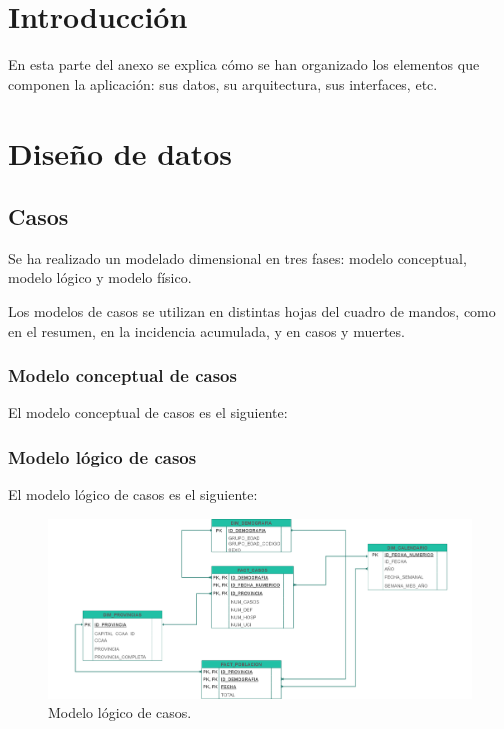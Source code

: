 
\section{Introducción}
En esta parte del anexo se explica cómo se han organizado los elementos que componen la aplicación: sus datos, su arquitectura, sus interfaces, etc.
\section{Diseño de datos}
\subsection{Casos}
Se ha realizado un modelado dimensional en tres fases: modelo conceptual, modelo lógico y modelo físico.

Los modelos de casos se utilizan en distintas hojas del cuadro de mandos, como en el resumen, en la incidencia acumulada, y en casos y muertes.

\subsubsection{Modelo conceptual de casos}
El modelo conceptual de casos es el siguiente:


\subsubsection{Modelo lógico de casos}

El modelo lógico de casos es el siguiente:

\begin{figure}[h]
    \advance\leftskip-0.5cm 
    \includegraphics[scale=0.25]{img/casos_logico.png}
    \caption{Modelo lógico de casos.}
\end{figure}
\newpage

